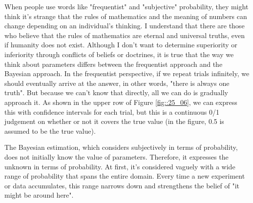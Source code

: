 \documentclass{ltjsbook}
\begin{document}
When people use words like "frequentist" and "subjective" probability, they might think it's strange that the rules of mathematics and the meaning of numbers can change depending on an individual's thinking. I understand that there are those who believe that the rules of mathematics are eternal and universal truths, even if humanity does not exist. Although I don't want to determine superiority or inferiority through conflicts of beliefs or doctrines, it is true that the way we think about parameters differs between the frequentist approach and the Bayesian approach. In the frequentist perspective, if we repeat trials infinitely, we should eventually arrive at the answer, in other words, "there is always one truth". But because we can't know that directly, all we can do is gradually approach it. As shown in the upper row of Figure \ref{fig::25_06}, we can express this with confidence intervals for each trial, but this is a continuous 0/1 judgement on whether or not it covers the true value (in the figure, 0.5 is assumed to be the true value).

The Bayesian estimation, which considers subjectively in terms of probability, does not initially know the value of parameters. Therefore, it expresses the unknown in terms of probability. At first, it's considered vaguely with a wide range of probability that spans the entire domain. Every time a new experiment or data accumulates, this range narrows down and strengthens the belief of "it might be around here".

\end{document}
